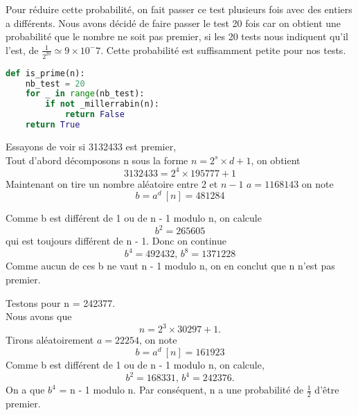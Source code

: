 Pour réduire cette probabilité, on fait passer ce test plusieurs fois avec des entiers a différents. 
Nous avons décidé de faire passer le test 20 fois car on obtient une probabilité que le nombre ne soit pas premier, si les 20 tests nous indiquent qu'il l'est, de $\frac{1}{2^{20}} \simeq 9 \times 10^-7$. Cette probabilité est suffisamment petite pour nos tests.
\begin{lstlisting}[language=Python]
def is_prime(n):
    nb_test = 20
    for _ in range(nb_test):
        if not _millerrabin(n):
            return False
    return True
\end{lstlisting}
\vspace{1em}

\begin{example}
    Essayons de voir si 3132433 est premier, \\
    Tout d'abord décomposons n sous la forme $n = 2^s \times d + 1$, on obtient \[3132433 = 2^4 \times 195777 + 1\]
    Maintenant on tire un nombre aléatoire entre 2 et $n - 1$ $a = 1168143$
    on note \[b = a^d ~ [n] = 481284\]
    
    Comme b est différent de 1 ou de n - 1 modulo n, on calcule \[b^2 = 265605\] qui est toujours différent de n - 1.
    Donc on continue 
    \[b^4 = 492432 \textrm{, }  b^8 = 1371228\]
    Comme aucun de ces b ne vaut n - 1 modulo n, on en conclut que n n'est pas premier.
    
\end{example}

\begin{example}
    Testons pour n = 242377. \\
    Nous avons que  \[n = 2^3 \times 30297 + 1.\]
    Tirons aléatoirement $a = 22254$, on note\\
    \[b = a^d ~ [n] = 161923\]
    Comme b est différent de 1 ou de n - 1 modulo n, on calcule,
    \[b^2 = 168331 \textrm{, } b^4 = 242376.\]
    On a que $b^4$ = n - 1 modulo n.
    Par conséquent, n  a une probabilité de $\frac{1}{2}$ d'être premier.
\end{example}
